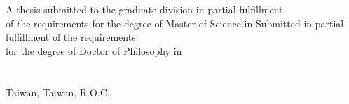 \begin{minipage}[c][5cm][t]{\textwidth}
  \begin{center}\Large %
  {%
    A thesis submitted to the graduate division in partial fulfillment\\
    of the requirements for the degree of Master of Science in%
  } %
  {%
    Submitted in partial fulfillment of the requirements\\%
    for the degree of Doctor of Philosophy in%
  } %
  \GetDeptEngName\\%
  \GetCollEngName\\%
  \GetSchoolEngName\\%
  Taiwan, Taiwan, R.O.C.\\%
  \vspace{0.1cm}
  \GetOralEngDay \thinspace \thinspace \GetThesisMonthInEng \thinspace \thinspace \GetThesisYear%
  \end{center}
\end{minipage}


\vspace{0.8cm}

\begin{minipage}[c][9.0cm][t]{\textwidth}
   \\

  \vspace{0.48cm}

  \DisplayCommitteeSignatureArea
\end{minipage}


\vspace{1.5cm}


\begin{minipage}[c][2.0cm][t]{\textwidth}
  \begin{center}
    \makebox[1em][c]{\Large:}
    \makebox[7.2em][l]{\namesigdate}\\

    \vspace{1.0cm}

    \makebox[1em][c]{\Large:}
    \makebox[7.2em][l]{\namesigdate}\\
  \end{center}
\end{minipage}

\EndOralTemplateDoc
